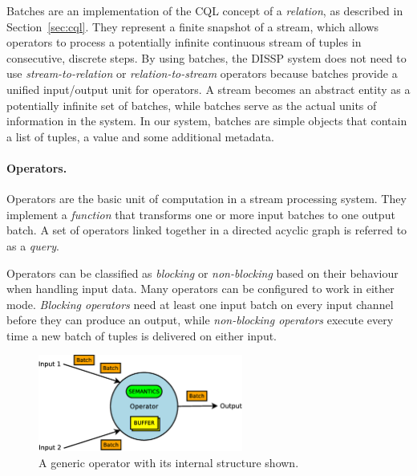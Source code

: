 Batches are an implementation of the CQL concept of a \textit{relation}, as described in
Section~\ref{sec:cql}.
They represent a finite snapshot of a stream, which allows operators to process a potentially infinite
continuous stream of tuples in consecutive, discrete steps. By using batches, the DISSP system does not
need to use \textit{stream-to-relation} or \textit{relation-to-stream} operators because batches provide
a unified input/output unit for operators. A stream becomes an abstract entity as a potentially infinite set of
batches, while batches serve as the actual units of information in the system.
In our system, batches are simple objects that contain a list of tuples, a \sic value and some additional
metadata. 
\paragraph*{Operators.}
\label{sec:operators}
Operators are the basic unit of computation in a stream processing system. They implement a
\textit{function} that transforms one or more input batches to one output batch. A set of operators
linked together in a directed acyclic graph is referred to as a \textit{query}.

Operators can be classified as \textit{blocking} or \textit{non-blocking} based on their behaviour when
handling input data. Many operators can be configured to work in either mode. 
\textit{Blocking operators} need at least one input batch on every input channel before they can
produce an output, while \textit{non-blocking operators} execute every time a new batch of tuples is
delivered on either input. 

\begin{figure}
	\centering
	\includegraphics[width=0.6\textwidth]{img/tesi/operator2.eps} 
	\caption{A generic operator with its internal structure shown.}
	\label{fig:op2}
\end{figure}    			

